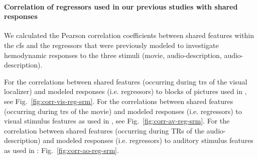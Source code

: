 \paragraph{Correlation of regressors used in our previous studies with shared
responses}








We calculated the Pearson correlation coefficients between shared features
within the \ac{cfs} and the regressors that were previously modeled
\citep{sengupta2016extension, haeusler2022processing} to investigate hemodynamic
responses to the three stimuli (movie, audio-description, audio-description).

%
For the correlations between shared features (occurring during \acp{tr} of the
visual localizer) and  modeled responses (i.e. regressors) to blocks of pictures
used in \citet{sengupta2016extension}, see Fig.~\ref{fig:corr-vis-reg-srm}.
%
For the correlations between shared features (occurring during \acp{tr} of the
movie) and modeled responses (i.e. regressors) to visual stimulus features as
used in \citet{haeusler2022processing}, see Fig.~\ref{fig:corr-av-reg-srm}.
%
For the correlation between shared features (occurring during TRs of the
audio-description) and modeled responses (i.e. regressors) to auditory stimulus
features as used in \citet{haeusler2022processing}:
Fig.~\ref{fig:corr-ao-reg-srm}.



